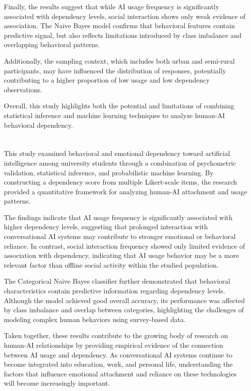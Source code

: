 \documentclass[10pt,a4paper]{article}
\begin{document}
Finally, the results suggest that while AI usage frequency is significantly associated with dependency levels, social interaction shows only weak evidence of association. The Naive Bayes model confirms that behavioral features contain predictive signal, but also reflects limitations introduced by class imbalance and overlapping behavioral patterns.

Additionally, the sampling context, which includes both urban and semi-rural participants, may have influenced the distribution of responses, potentially contributing to a higher proportion of low usage and low dependency observations.

Overall, this study highlights both the potential and limitations of combining statistical inference and machine learning techniques to analyze human-AI behavioral dependency.
\section{{\color{colorIPN}{Conclusion}}}

This study examined behavioral and emotional dependency toward artificial intelligence among university students through a combination of psychometric validation, statistical inference, and probabilistic machine learning. By constructing a dependency score from multiple Likert-scale items, the research provided a quantitative framework for analyzing human-AI attachment and usage patterns.

The findings indicate that AI usage frequency is significantly associated with higher dependency levels, suggesting that prolonged interaction with conversational AI systems may contribute to stronger emotional or behavioral reliance. In contrast, social interaction frequency showed only limited evidence of association with dependency, indicating that AI usage behavior may be a more relevant factor than offline social activity within the studied population.

The Categorical Naive Bayes classifier further demonstrated that behavioral characteristics contain predictive information regarding dependency levels. Although the model achieved good overall accuracy, its performance was affected by class imbalance and overlap between categories, highlighting the challenges of modeling complex human behaviors using survey-based data.

Taken together, these results contribute to the growing body of research on human-AI relationships by providing empirical evidence of the connection between AI usage and dependency. As conversational AI systems continue to become integrated into education, work, and personal life, understanding the factors that influence emotional attachment and reliance on these technologies will become increasingly important.
\end{document}
